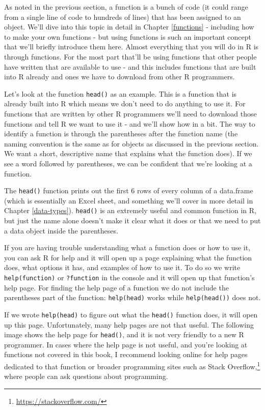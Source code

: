 \documentclass[
]{krantz}
\renewcommand{\href}[2]{#2\footnote{\url{#1}}}
\begin{document}
As noted in the previous section, a function is a bunch of
code (it could range from a single line of code to hundreds
of lines) that has been assigned to an object. We'll dive
into this topic in detail in Chapter \ref{functions} -
including how to make your own functions - but using
functions is such an important concept that we'll briefly
introduce them here. Almost everything that you will do in R
is through functions. For the most part that'll be using
functions that other people have written that are available
to use - and this includes functions that are built into R
already and ones we have to download from other R
programmers.

Let's look at the function \texttt{head()} as an example.
This is a function that is already built into R which means
we don't need to do anything to use it. For functions that
are written by other R programmers we'll need to download
those functions and tell R we want to use it - and we'll
show how in a bit. The way to identify a function is through
the parentheses after the function name (the naming
convention is the same as for objects as discussed in the
previous section. We want a short, descriptive name that
explains what the function does). If we see a word followed
by parentheses, we can be confident that we're looking at a
function.

The \texttt{head()} function prints out the first 6 rows of
every column of a data.frame (which is essentially an Excel
sheet, and something we'll cover in more detail in Chapter
\ref{data-types}). \texttt{head()} is an extremely useful
and common function in R, but just the name alone doesn't
make it clear what it does or that we need to put a data
object inside the parentheses.

If you are having trouble understanding what a function does
or how to use it, you can ask R for help and it will open up
a page explaining what the function does, what options it
has, and examples of how to use it. To do so we write
\texttt{help(function)} or \texttt{?function} in the console
and it will open up that function's help page. For finding
the help page of a function we do not include the
parentheses part of the function: \texttt{help(head)} works
while \texttt{help(head())} does not.

If we wrote \texttt{help(head)} to figure out what the
\texttt{head()} function does, it will open up this page.
Unfortunately, many help pages are not that useful. The
following image shows the help page for \texttt{head()}, and
it is not very friendly to a new R programmer. In cases
where the help page is not useful, and you're looking at
functions not covered in this book, I recommend looking
online for help pages dedicated to that function or broader
programming sites such as
\href{https://stackoverflow.com/}{Stack Overflow,} where
people can ask questions about programming.
\end{document}
